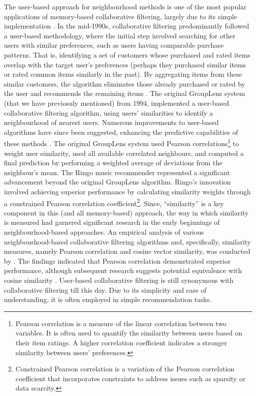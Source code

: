 The user-based approach for neighbourhood methods is one of the most popular applications of memory-based collaborative filtering, largely due to its simple implementation \cite{herlocker1999algorithmic}. In the mid-1990s, collaborative filtering predominantly followed a user-based methodology, where the initial step involved searching for other users with similar preferences, such as users having comparable purchase patterns. That is, identifying a set of customers whose purchased and rated items overlap with the target user's preferences (perhaps they purchased similar items or rated common items similarly in the past). By aggregating items from these similar customers, the algorithm eliminates those already purchased or rated by the user and recommends the remaining items \cite{smith2017two}. The original GroupLens system \cite{resnick1994grouplens} (that we have previosuly mentioned) from 1994, implemented a user-based collaborative filtering algorithm, using users' similarities to identify a neighbourhood of nearest users. Numerous improvements to user-based algorithms have since been suggested, enhancing the predictive capabilities of these methods \cite{breese2013empirical}. The original GroupLens system used Pearson correlations\footnote{Pearson correlation is a measure of the linear correlation between two variables. It is often used to quantify the similarity between users based on their item ratings. A higher correlation coefficient indicates a stronger similarity between users' preferences.} to weight user similarity, used all available correlated neighbours, and computed a final prediction by performing a weighted average of deviations from the neighbour’s mean. The Ringo music recommender \cite{shardanand1995social} represented a significant advancement beyond the original GroupLens algorithm. Ringo's innovation involved achieving superior performance by calculating similarity weights through a constrained Pearson correlation coefficient\footnote{Constrained Pearson correlation is a variation of the Pearson correlation coefficient that incorporates constraints to address issues such as sparsity or data scarcity.}. Since, “similarity” is a key component in this (and all memory-based) approach, the way in which similarity is measured had garnered significant research in the early beginnings of neighbourhood-based approaches. An empirical analysis of various neighbourhood-based collaborative filtering algorithms and, specifically, similarity measures, namely Pearson correlation and cosine vector similarity, was conducted by \cite{breese2013empirical}. The findings indicated that Pearson correlation demonstrated superior performance, although subsequent research suggests potential equivalence with cosine similarity \cite{pennock2013collaborative}. User-based collaborative filtering is still synonymous with collaborative filtering till this day. Due to its simplicity and ease of understanding, it is often employed in simple recommendation tasks. 


